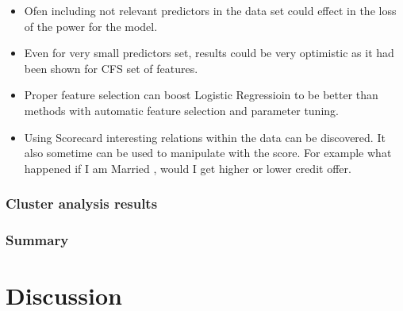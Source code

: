 \documentclass[10pt]{article}\usepackage[]{graphicx}\usepackage[]{color}
\begin{document}
\begin{itemize}

\item Ofen including not relevant predictors in the data set could effect in the loss of the power for the model.

\item Even for very small predictors set, results could be very optimistic as it had been shown for CFS set of features. 

\item Proper feature selection can boost Logistic Regressioin to be better than methods with automatic feature selection and parameter tuning. 

\item Using Scorecard interesting relations within the data can be discovered. It also sometime can be used to manipulate with the score. For example what happened if I am Married , would I get higher or lower credit offer. 

\end{itemize}


\clearpage

\clearpage
 
\section{Cluster analysis results}


\clearpage
\section{Summary}



\clearpage
\part{Discussion}
\end{document}
